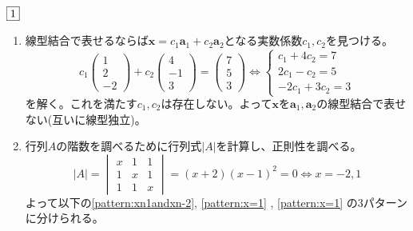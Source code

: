 \documentclass[dvipdfmx]{jsreport}
\DeclareMathOperator{\rank}{rank}
\newcounter{num}[section]
\begin{document}
\begin{answer} %
	$\fbox{1}$
\begin{enumerate}
	\item 線型結合で表せるならば$\bm{x}= c_1\bm{a}_1+ c_2\bm{a}_2$となる実数係数$c_1, c_2$を見つける。
\begin{equation*}
	c_1\begin{pmatrix}1\\ 2\\ -2\end{pmatrix}+ c_2\begin{pmatrix}4\\ -1\\ 3\end{pmatrix}= \begin{pmatrix}7\\ 5\\ 3\end{pmatrix}
	\iff
	\begin{cases}
		c_1+ 4c_2= 7\\
		2c_1- c_2= 5\\
		-2c_1+ 3c_2= 3
	\end{cases}
\end{equation*}
	を解く。これを満たす$c_1, c_2$は存在しない。よって$\bm{x}$を$\bm{a}_1, \bm{a}_2$の線型結合で表せない(互いに線型独立)。
	\item 行列$A$の階数を調べるために行列式$|A|$を計算し、正則性を調べる。
\begin{equation*}
	|A|= \begin{vmatrix}x& 1& 1\\ 1& x& 1\\ 1& 1& x\end{vmatrix}= (x+2)(x-1)^2= 0\iff x= -2, 1
\end{equation*}
	よって以下の\ref{pattern:xn1andxn-2}, \ref{pattern:x=1} , \ref{pattern:x=1} の3パターンに分けられる。
\end{enumerate}
\end{answer}
\end{document}
